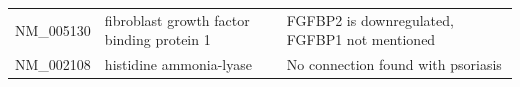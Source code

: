 \documentclass[10pt,a4paper]{article}
\begin{document}
\begin{table}[]
\begin{tabular}{l|p{4.5cm} p{8.5cm}}
		NM\_005130         & fibroblast growth factor binding protein 1                                                                              & FGFBP2 is downregulated, FGFBP1 not mentioned\cite{suarez2012expanding}                                                                                                                                                                                               \\
		NM\_002108         & histidine ammonia-lyase                                                                                                 & No connection found with psoriasis                                                                                                                                                                                                                                          \\ \hline                                                                                                                                                                                                                                        
	\end{tabular}
\end{table}
	
\end{document}
